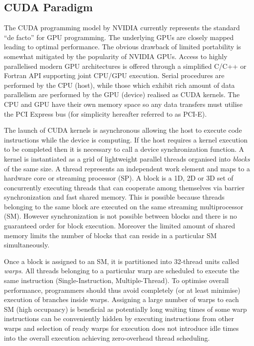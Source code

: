 \documentclass[smallextended]{svjour3}
\begin{document}
\subsection{CUDA Paradigm} 
\label{sec:cuda}

The CUDA programming model \cite{cudaurl} by NVIDIA currently represents the standard ``de facto'' for GPU programming. The underlying GPUs are closely mapped leading to optimal performance. The obvious drawback of limited portability is somewhat mitigated by the popularity of NVIDIA GPUs. Access to highly parallelised modern GPU architectures is offered through a simplified C/C++ or Fortran API supporting joint CPU/GPU execution. Serial procedures are performed by the CPU (host), while those which exhibit rich amount of data parallelism are performed by the GPU (device) realised as CUDA kernels. The CPU and GPU have their own memory space so any data transfers must utilise the PCI Express bus (for simplicity hereafter referred to as PCI-E).

The launch of CUDA kernels is asynchronous allowing the host to execute code instructions while the device is computing. If the host requires a kernel execution to be completed then it is necessary to call a device synchronization function. A kernel is instantiated as a grid of lightweight parallel threads organised into {\em blocks} of the same size. A thread represents an independent work element and maps to a hardware core or streaming processor (SP). A block is a 1D, 2D or 3D set of concurrently executing threads that can cooperate among themselves via barrier synchronization and fast shared memory. This is possible because threads belonging to the same block are executed on the same streaming multiprocessor (SM). However synchronization is not possible between blocks and there is no guaranteed order for block execution. Moreover the limited amount of shared memory limits the number of  blocks that can reside in a particular SM simultaneously.  

Once a block is assigned to an SM, it is partitioned into 32-thread units called {\em warps}. All threads belonging to a particular warp are scheduled to execute the same instruction (Single-Instruction, Multiple-Thread). To optimise overall performance, programmers should thus avoid completely (or at least minimise) execution of branches inside warps. Assigning a large number of warps to each SM (high occupancy) is beneficial as potentially long waiting times of some warp instructions can be conveniently hidden by executing instructions from other warps and selection of ready warps for execution does not introduce idle times into the overall execution achieving zero-overhead thread scheduling. 
\end{document}

